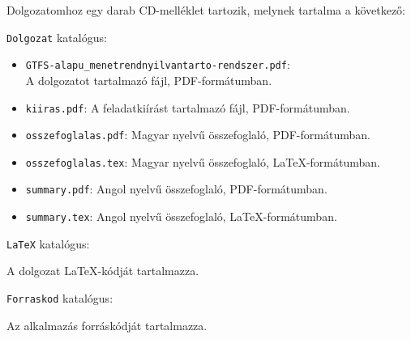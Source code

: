 
Dolgozatomhoz egy darab CD-melléklet tartozik, melynek tartalma a következő:

\bigskip

\noindent \texttt{Dolgozat} katalógus:

\begin{itemize}
\item \texttt{GTFS-alapu\_menetrendnyilvantarto-rendszer.pdf}: \\ A dolgozatot tartalmazó fájl, PDF-formátumban.
\item \texttt{kiiras.pdf}: A feladatkiírást tartalmazó fájl, PDF-formátumban.
\item \texttt{osszefoglalas.pdf}: Magyar nyelvű összefoglaló, PDF-formátumban.
\item \texttt{osszefoglalas.tex}: Magyar nyelvű összefoglaló, \LaTeX-formátumban.
\item \texttt{summary.pdf}: Angol nyelvű összefoglaló, PDF-formátumban.
\item \texttt{summary.tex}: Angol nyelvű összefoglaló, \LaTeX-formátumban.
\end{itemize}

\bigskip

\noindent \texttt{LaTeX} katalógus:

A dolgozat \LaTeX-kódját tartalmazza.

\bigskip

\noindent \texttt{Forraskod} katalógus:

Az alkalmazás forráskódját tartalmazza.
